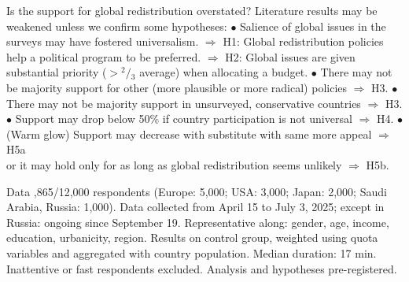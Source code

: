 \documentclass[aspectratio=169,xcolor=dvipsnames, 11pt,mathserif]{beamer}
\begin{document}
\begin{frame}{Is the support for global redistribution overstated?}
\bbsp
\ip Literature results may be weakened unless we confirm some hypotheses:
\ip $\bullet$ Salience of global issues in the surveys may have fostered universalism. %
\ip $\Rightarrow$ H1: Global redistribution policies help a political program to be preferred.
\ip $\Rightarrow$ H2: Global issues are given substantial priority ($>\!^{2}\!/\!_{3}$ average) when allocating a budget.
\ip $\bullet$ There may not be majority support for other (more plausible or more radical) policies $\Rightarrow$ H3.
\ip $\bullet$ There may not be majority support in unsurveyed, conservative countries $\Rightarrow$ H3.
\ip $\bullet$ Support may drop below 50\% if country participation is not universal $\Rightarrow$ H4.
\ip $\bullet$ (Warm glow) Support may decrease with substitute with same more appeal $\Rightarrow$ H5a \\ 
\quad or it may hold only for as long as global redistribution seems unlikely $\Rightarrow$ H5b.
\ee
\end{frame}

\begin{frame}{Data\label{data}}
  \vspace{.1cm}
 \vspace{-.5cm}
\bbvs
{},865/12,000 respondents (Europe: 5,000; USA: 3,000; Japan: 2,000; Saudi Arabia, Russia: 1,000).
\ip Data collected from April 15 to July 3, 2025; except in Russia: ongoing since September 19.
\ip Representative along: gender, age, income, education, urbanicity, region. \hyperlink{representativeness}{} 
\ip Results on control group, weighted using quota variables and aggregated with country population.
\ip Median duration: 17 min. Inattentive or fast respondents excluded.
\ip Analysis and hypotheses pre-registered.
\ee
\end{frame}

\end{document}
